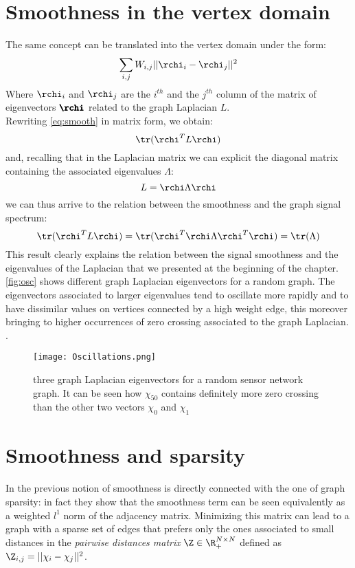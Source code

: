 \section{Smoothness in the vertex domain}
The same concept can be translated into the vertex domain under the form:
\begin{equation}
\sum_{i,j}W_{i,j}||\rchi_i - \rchi_j||^2
\label{eq:smoothVertex}
\end{equation}
Where $\rchi_i$ and $\rchi_j$ are the $i^{th}$ and the $j^{th}$ column of the matrix of eigenvectors $\pmb{\rchi}$ related to the graph Laplacian $L$.\\
Rewriting \autoref{eq:smooth} in matrix form, we obtain\cite{Kalofolias2016}:
\begin{equation}
\tr(\rchi^T L \rchi)
\label{eq:smoothMatrix}
\end{equation}
and, recalling that in the Laplacian matrix we can explicit the diagonal matrix containing the associated eigenvalues $\Lambda$:
\begin{equation}
L = \rchi \Lambda \rchi
\label{eq:diag}
\end{equation}
we can thus arrive to the relation between the smoothness and the graph signal spectrum:
\begin{equation}
\tr(\rchi^T L \rchi) = \tr(\rchi^T \rchi \Lambda \rchi^T \rchi) = \tr(\Lambda)
\end{equation}
This result clearly explains the relation between the signal smoothness and the eigenvalues of the Laplacian that we presented at the beginning of the chapter.\autoref{fig:osc} shows different graph Laplacian eigenvectors for a random graph. The eigenvectors associated to larger eigenvalues tend to oscillate more rapidly and to have dissimilar values on vertices connected by a high weight edge, this moreover bringing to higher occurrences of zero crossing associated to the graph Laplacian. \cite{Shuman2013}.

\begin{figure}[tb]
\centering
\texttt{[image: Oscillations.png]}
\caption{three graph Laplacian eigenvectors for a random sensor network graph. It can be seen how $\chi_{50}$ contains definitely more zero crossing than the other two vectors $\chi_0$ and $\chi_1$}
\label{fig:osc}
\end{figure}

\section{Smoothness and sparsity}
In \cite{Kalofolias2016} the previous notion of smoothness is directly connected with the one of graph sparsity: in fact they show that the smoothness term can be seen equivalently as a weighted $l^1$ norm of the adjacency matrix. Minimizing this matrix can lead to a graph with a sparse set of edges that prefers only the ones associated to small distances in the \textit{pairwise distances matrix} $\Z \in \R^{N\times N}_+$ defined as $\Z_{i,j} = ||\chi_i - \chi_j||^2$.

